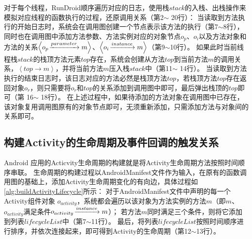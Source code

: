 对于每个线程，RunDroid顺序遍历对应的日志，使用栈$stack$的入栈、出栈操作来模拟对应线程的函数执行的过程，还原调用关系（第2$\sim$ 20行）：
当读取到方法执行的开始日志时，系统会在调用图创建一个节点表示该方法的执行（第7$\sim$8行），
同时也在调用图中添加方法参数、方法实例对应的对象节点$o_p$、$o_i$以及方法对象和方法的关系$ \left\langle  o_p \joinrel\xrightarrow{parameter}   m \right\rangle   $、$ \left\langle   o_i \joinrel\xrightarrow{instance}   m \right\rangle  $（第9$\sim$10行）。
如果此时当前线程栈$stack$的栈顶方法元素$top$存在，系统会创建从方法$top$到当前方法$m$的调用关系，$\left\langle top \to m \right \rangle  $，并将当前方法$m$压入栈$stack$中（第11$\sim$ 14行）。
当读取到方法执行的结束日志时，该日志对应的方法必然是栈顶方法$top$，若栈顶方法$top$存在返回对象$o_r$，则只需要将$o_r$和$top$的关系添加到调用图中即可，最后弹出栈顶的$top$即可（第 16$\sim$ 18行）。
在上述过程中，如果待添加的方法对象在调用图中已存在，该对象复用调用图原有的对象节点即可，无须重新添加，只需添加方法与对象间的关系即可。








\subsection{构建Activity的生命周期及事件回调的触发关系}



Android 应用的Acticvity生命周期的构建就是将Activity生命周期方法按照时间顺序串联。%
生命周期的构建过程以AndroidManifest文件作为输入，在原有的函数调用图的基础上，添加Activity生命周期变化的有向边，具体过程如\autoref{alg:buildActivityLifecycle}所示：
对于AndroidManifest文件中声明的每一个Activity组件对象 $o_{activity}$，系统都会遍历以该对象为方法实例的方法$m$（即$m$、$o_{activity}$满足条件$o_{activity} \joinrel\xrightarrow{instance} m$）；
若方法$m$同时满足三个条件，则将它添加到列表$lifecycleList$中（第7$\sim$11行）。
最后，将列表$lifecycleList$按照时间顺序进行排序，并依次连接起来，即可得到{Activity}的生命周期（第12$\sim$13行）。

